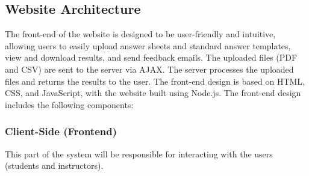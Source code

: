 \documentclass[twocolumn]{article}
\begin{document}
    \subsection{Website Architecture}
    The front-end of the website is designed to be user-friendly and intuitive, allowing users to easily upload answer sheets and standard answer templates, view and download results, and send feedback emails. The uploaded files (PDF and CSV) are sent to the server via AJAX. The server processes the uploaded files and returns the results to the user. The front-end design is based on HTML, CSS, and JavaScript, with the website built using Node.js. The front-end design includes the following components: 
        \subsubsection{Client-Side (Frontend)}
        This part of the system will be responsible for interacting with the users (students and instructors). 
\end{document}
